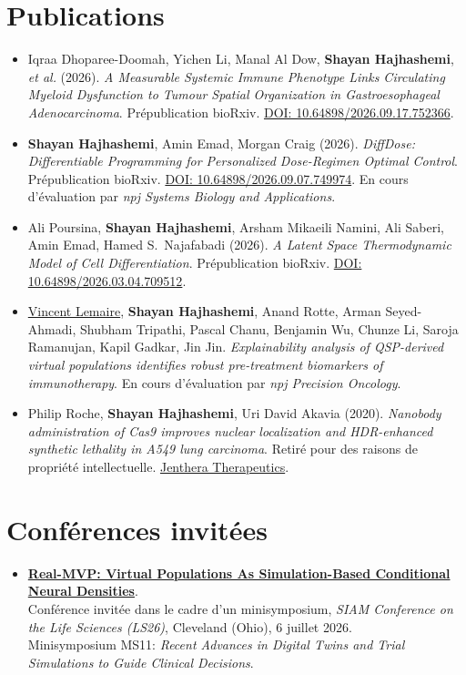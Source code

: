 \documentclass{article}
\newcommand{\cvsection}[1]{\section*{\rmfamily#1}}
\begin{document}
\cvsection{Publications}
\begin{itemize}[leftmargin=1em, itemsep=1pt]
    \item Iqraa Dhoparee-Doomah, Yichen Li, Manal Al Dow, \textbf{Shayan Hajhashemi}, \textit{et al.} (2026).
    \emph{A Measurable Systemic Immune Phenotype Links Circulating Myeloid Dysfunction to Tumour Spatial Organization in Gastroesophageal Adenocarcinoma}.
    Prépublication bioRxiv. \href{https://doi.org/10.64898/2026.09.17.752366}{DOI: 10.64898/2026.09.17.752366}.

    \item \textbf{Shayan Hajhashemi}, Amin Emad, Morgan Craig (2026).
    \emph{DiffDose: Differentiable Programming for Personalized Dose-Regimen Optimal Control}.
    Prépublication bioRxiv. \href{https://doi.org/10.64898/2026.09.07.749974}{DOI: 10.64898/2026.09.07.749974}.
    En cours d'évaluation par \emph{npj Systems Biology and Applications}.

    \item Ali Poursina, \textbf{Shayan Hajhashemi}, Arsham Mikaeili Namini, Ali Saberi, Amin Emad, Hamed S.~Najafabadi (2026).
    \emph{A Latent Space Thermodynamic Model of Cell Differentiation}.
    Prépublication bioRxiv. \href{https://doi.org/10.64898/2026.03.04.709512}{DOI: 10.64898/2026.03.04.709512}.

    \item \href{https://www.gene.com/scientists/our-scientists/vincent-lemaire}{Vincent Lemaire}, \textbf{Shayan Hajhashemi}, Anand Rotte, Arman Seyed-Ahmadi, Shubham Tripathi, Pascal Chanu, Benjamin Wu, Chunze Li, Saroja Ramanujan, Kapil Gadkar, Jin Jin.
    \emph{Explainability analysis of QSP-derived virtual populations identifies robust pre-treatment biomarkers of immunotherapy}.
    En cours d'évaluation par \emph{npj Precision Oncology}.

    \item Philip Roche, \textbf{Shayan Hajhashemi}, Uri David Akavia (2020).
    \emph{Nanobody administration of Cas9 improves nuclear localization and HDR-enhanced synthetic lethality in A549 lung carcinoma}.
    Retiré pour des raisons de propriété intellectuelle. \href{https://www.jenthera.com/}{Jenthera Therapeutics}.
\end{itemize}


\cvsection{Conférences invitées}
\begin{itemize}[leftmargin=1em]
    \item \href{https://meetings.siam.org/sess/dsp_talk.cfm?p=157552}{\textbf{Real-MVP: Virtual Populations As Simulation-Based Conditional Neural Densities}}.\\
    Conférence invitée dans le cadre d'un minisymposium, \emph{SIAM Conference on the Life Sciences (LS26)}, Cleveland (Ohio), 6 juillet 2026.\\
    Minisymposium MS11: \emph{Recent Advances in Digital Twins and Trial Simulations to Guide Clinical Decisions}.
\end{itemize}
\end{document}

